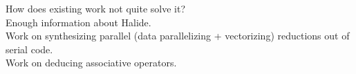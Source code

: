 How does existing work not quite solve it? \\
Enough information about Halide. \\
Work on synthesizing parallel (data parallelizing + vectorizing) reductions out of serial code. \\
Work on deducing associative operators.
